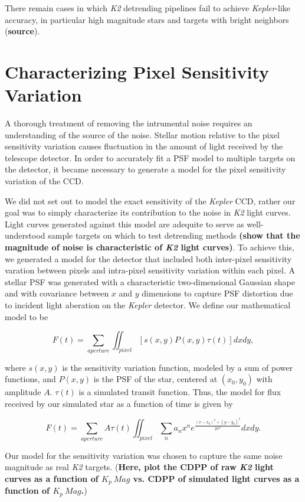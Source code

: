 \documentclass[12pt,preprint]{aastex}
\begin{document}
There remain cases in which \textit{K2} detrending pipelines fail to achieve \textit{Kepler}-like accuracy, in particular high magnitude stars and targets with bright neighbors (\textbf{source}). 

\section{Characterizing Pixel Sensitivity Variation}

A thorough treatment of removing the intrumental noise requires an understanding of the source of the noise. Stellar motion relative to the pixel sensitivity variation causes fluctuation in the amount of light received by the telescope detector. In order to accurately fit a PSF model to multiple targets on the detector, it became necessary to generate a model for the pixel sensitivity variation of the CCD. 

We did not set out to model the exact sensitivity of the \textit{Kepler} CCD, rather our goal was to simply characterize its contribution to the noise in \textit{K2} light curves. Light curves generated against this model are adequite to serve as well-understood sample targets on which to test detrending methods \textbf{(show that the magnitude of noise is characteristic of \textit{K2} light curves)}. To achieve this, we generated a model for the detector that included both inter-pixel sensitivity varation between pixels and intra-pixel sensitivity variation within each pixel. A stellar PSF was generated with a characteristic two-dimensional Gaussian shape and with covariance between $x$ and $y$ dimensions to capture PSF distortion due to incident light aberation on the \textit{Kepler} detector. We define our mathematical model to be

\[
F(t) = \sum_{aperture} \iint_{pixel} [s(x,y)P(x,y)\tau(t)] dxdy, 
\]

where $s(x,y)$ is the sensitivity variation function, modeled by a sum of power functions, and $P(x,y)$ is the PSF of the star, centered at $(x_0,y_0)$ with amplitude $A$. $\tau (t)$ is a simulated transit function. Thus, the model for flux received by our simulated star as a function of time is given by

\[
F(t) = \sum_{aperture} A\tau(t) \iint_{pixel} \sum_n a_n x^n e^{\frac{\left(x-x_0 \right)^2+\left( y-y_0 \right)^2}{2\sigma^2}} dxdy.
\]

Our model for the sensitivity variation was chosen to capture the same noise magnitude as real \textit{K2} targets. (\textbf{Here, plot the CDPP of raw \textit{K2} light curves as a function of $K_p\ Mag$ vs. CDPP of simulated light curves as a function of $K_p\ Mag$.})
\end{document}
